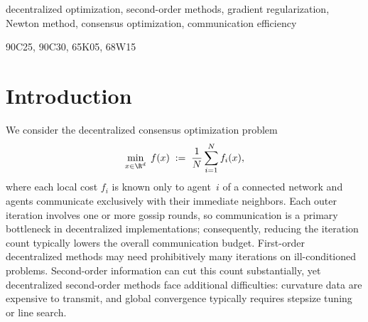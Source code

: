 \documentclass[review,onefignum,onetabnum]{siamart171218}
\begin{document}
	\maketitle

\begin{abstract}
We propose \textsc{DisGrem}, a fully decentralized second-order method
for convex consensus optimization over networks.
Each agent solves a local Newton system with vanishing
gradient-norm regularization $\lambda_{i,k}=\sqrt{M\|\tilde g_{i,k}\|}$
and an eigenvalue-shift stabilizer, communicating through a two-stage
gossip-mixing mechanism.
We introduce a reference-step framework that reduces the
network-wide update to an inexact centralized regularized Newton step,
replacing the static Hessian-heterogeneity assumptions of prior work
with an increment-based dispersion analysis that imposes no
irreducible accuracy floor.
After a lower-order burn-in phase, \textsc{DisGrem} achieves
$\|\nabla f(\bar x_k)\|\le\varepsilon$ in $\cO(\varepsilon^{-1})$
iterations---matching the centralized regularized Newton
rate---without line search or stepsize tuning; the total
communication cost is $\cO(\varepsilon^{-1}\log(1/\varepsilon))$ rounds.
Under strong convexity, we further establish local superlinear convergence
of order $3/2$.
In our nine-problem benchmark suite, the \textsc{DisGrem} family attains
$\mathrm{relF}\le 10^{-6}$ on every test instance, whereas every baseline
stagnates or diverges on at least one problem.
\end{abstract}


\begin{keywords}
  decentralized optimization, second-order methods, gradient regularization, Newton method, consensus optimization, communication efficiency
\end{keywords}

\begin{AMS}
  90C25, 90C30, 65K05, 68W15
\end{AMS}


\section{Introduction}\label{sec:intro}
We consider the decentralized consensus optimization problem
\begin{equation}\label{eq:intro_prob}
	\min_{x\in\R^d}\; f(x)\;:=\;\frac{1}{N}\sum_{i=1}^N f_i(x),
\end{equation}
where each local cost $f_i$ is known only to agent~$i$ of a
connected network and agents communicate exclusively with their
immediate neighbors.
Each outer iteration involves one or more gossip rounds, so communication is a primary bottleneck in decentralized implementations; consequently, reducing the iteration count typically lowers the overall communication budget.
First-order decentralized methods may need prohibitively many
iterations on ill-conditioned problems.
Second-order information can cut this count substantially, yet
decentralized second-order methods face additional difficulties:
curvature data are expensive to transmit, and global convergence
typically requires stepsize tuning or line search.
\end{document}
